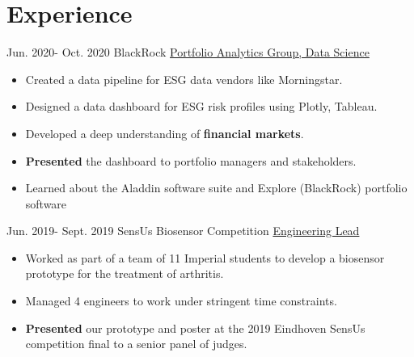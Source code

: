\documentclass[letterpaper]{twentysecondcv} %
\begin{document}
\section{Experience}
\begin{twenty}
    \twentyitem
        {Jun. 2020-}
        {Oct. 2020}
        {BlackRock}
        {\href{http://www.blackrock.com}{Portfolio Analytics Group, Data Science}}
        {}
        {\vspace{-1mm} \begin{itemize}
            \item Created a data pipeline for ESG data vendors like Morningstar. 
            \item Designed a data dashboard for ESG risk profiles using Plotly, Tableau.
            \item Developed a deep understanding of \textbf{financial markets}.
            \item \textbf{Presented} the dashboard to portfolio managers and stakeholders. 
            \item Learned about the Aladdin software suite and Explore (BlackRock) portfolio software
        \end{itemize}
        }
    \end{twenty}
    
\begin{twenty}
    \twentyitem
        {Jun. 2019-}
        {Sept. 2019}
        {SensUs Biosensor Competition}
        {\href{http://www.sensus.org}{Engineering Lead}}
        {}
        {\vspace{-1mm} \begin{itemize}
            \item Worked as part of a team of 11 Imperial students to develop a biosensor prototype for the treatment of arthritis. 
            \item Managed 4 engineers to work under stringent time constraints.
            \item \textbf{Presented} our prototype and poster at the 2019 Eindhoven SensUs competition final to a senior panel of judges. \vspace{1mm}
        \end{itemize}
        }
    \end{twenty}
    
\end{document}

